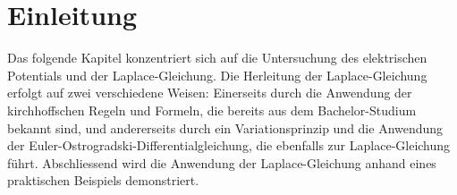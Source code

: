 %
%
%
%
\section{Einleitung\label{circuit:section:teil0}}
Das folgende Kapitel konzentriert sich auf die Untersuchung des elektrischen Potentials und der Laplace-Gleichung. Die Herleitung der Laplace-Gleichung erfolgt auf zwei verschiedene Weisen: Einerseits durch die Anwendung der kirchhoffschen Regeln und Formeln, die bereits aus dem Bachelor-Studium bekannt sind, und andererseits durch ein Variationsprinzip und die Anwendung der Euler-Ostrogradski-Differentialgleichung, die ebenfalls zur Laplace-Gleichung führt. Abschliessend wird die Anwendung der Laplace-Gleichung anhand eines praktischen Beispiels demonstriert.




